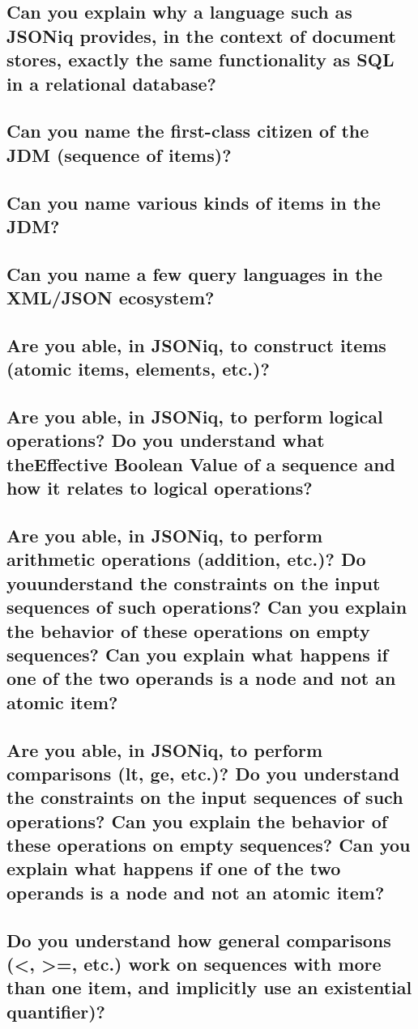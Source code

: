 \documentclass{article}
\begin{document}
\subsection{Can you explain why a language such as JSONiq provides, in the context of document stores, exactly the same functionality as SQL in a relational database?}
\subsection{Can you name the first-class citizen of the JDM (sequence of items)?}
\subsection{Can you name various kinds of items in the JDM?}
\subsection{Can you name a few query languages in the XML/JSON ecosystem?}
\subsection{Are you able, in JSONiq, to construct items (atomic items, elements, etc.)?}
\subsection{Are you able, in JSONiq, to perform logical operations? Do you understand what theEffective Boolean Value of a sequence and how it relates to logical operations?}
\subsection{Are you able, in JSONiq, to perform arithmetic operations (addition, etc.)? Do youunderstand the constraints on the input sequences of such operations? Can you explain the behavior of these operations on empty sequences? Can you explain what happens if one of the two operands is a node and not an atomic item?}
\subsection{Are you able, in JSONiq, to perform comparisons (lt, ge, etc.)? Do you understand the constraints on the input sequences of such operations? Can you explain the behavior of these operations on empty sequences? Can you explain what happens if one of the two operands is a node and not an atomic item?}
\subsection{Do you understand how general comparisons (<, >=, etc.) work on sequences with more than one item, and implicitly use an existential quantifier)?}
\end{document}
